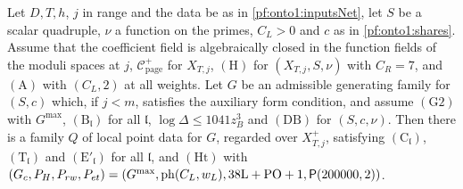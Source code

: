 \begin{theorem}\label{pf:onto1:primeData}
Let $D,T,h$, $j$ in range and the data be as in \cref{pf:onto1:inputsNet}, let $S$ be a scalar quadruple, $\nu$ a function on
the primes, $C_L>0$ and $c$ as in \cref{pf:onto1:shares}. Assume that the coefficient field is algebraically closed in the
function fields of the moduli spaces at $j$, $\mathcal C^+_{\mathrm{page}}$ for $X_{T,j}$, $(\mathrm H)$ for $(X_{T,j},S,\nu)$ with $C_R=7$,
and $(\mathrm A)$ with $(C_L,2)$ at all weights. Let $G$ be an admissible generating family for $(S,c)$ which, if $j<m$,
satisfies the auxiliary form condition, and assume $(\mathrm G2)$ with $G^{\max}$, $(\mathrm B_{\mathfrak l})$ for all $\mathfrak l$,
$\log\Delta\le1041z_B^3$ and $(\mathrm{DB})$ for $(S,c,\nu)$. Then there is a family $Q$ of local point data for $G$, regarded over
$X^+_{T,j}$, satisfying $(\mathrm C_{\mathfrak l})$, $(\mathrm T_{\mathfrak l})$ and $(\mathrm E'_{\mathfrak l})$ for all $\mathfrak l$, and $(\mathrm{Ht})$
with $(G_c,P_H,P_{rw},P_{et})=(G^{\max},\mathrm{ph}(C_L,w_L),38\mathrm L+\mathrm{PO}+1,\mathsf{P}(200000,2))$.
\end{theorem}

